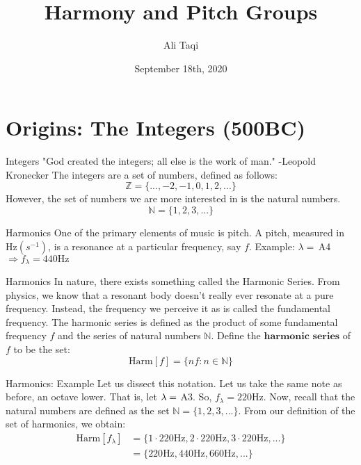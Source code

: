 \documentclass[usenames,dvipsnames]{beamer}
\title{Harmony and Pitch Groups}
\date{September 18th, 2020}
\author{Ali Taqi}
\institute{Reed Student Colloquium}
\newcommand{\N}{\mathbb{N}}
\newcommand{\Hz}{\text{Hz}}
\begin{document}
  \maketitle
  \section{Origins: The Integers (500BC)}

  \begin{frame}{Integers}
  "God created the integers; all else is the work of man." -Leopold Kronecker \newline
  The integers are a set of numbers, defined as follows: \newline
  $$\mathbb{Z} = \{...,-2,-1,0,1,2,...\}$$
  \newline
  However, the set of numbers we are more interested in is the natural numbers. \newline
  $$\mathbb{N} = \{1,2,3,...\}$$
  \end{frame}

  \begin{frame}{Harmonics}
One of the primary elements of music is pitch. A pitch, measured in $\Hz (s^{-1})$, is a resonance at a particular frequency, say $f$. \newline
  Example: $\lambda = \,$A4 $\Rightarrow f_\lambda = 440\Hz$ \newline
  \end{frame}
  
  \begin{frame}{Harmonics}
  In nature, there exists something called the Harmonic Series. From physics, we know that a resonant body doesn't really ever resonate at a pure frequency. Instead, the frequency we perceive it as is called the fundamental frequency. 
  The harmonic series is defined as the product of some fundamental frequency $f$ and the series of natural numbers $\N$. Define the $\textbf{harmonic series}$ of $f$ to be the set:\newline 
  $$\text{Harm}[f] = \{nf : n \in \mathbb{N}\}$$
  \end{frame}
  
  \begin{frame}{Harmonics: Example}
      Let us dissect this notation. Let us take the same note as before, an octave lower. That is, let $\lambda = \space$ A3. So, $f_\lambda = 220\Hz$. Now, recall that the natural numbers are defined as the set $\mathbb{N} = \{1,2,3,...\}$. From our definition of the set of harmonics, we obtain:
  \begin{align*}
  \text{Harm}[f_\lambda] &= \{1\cdot220\Hz, 2\cdot220\Hz, 3\cdot220\Hz, ...\} \\
  &= \{220\Hz, 440\Hz, 660\Hz, ...\}
  \end{align*}
  \end{frame}
  
\end{document}

